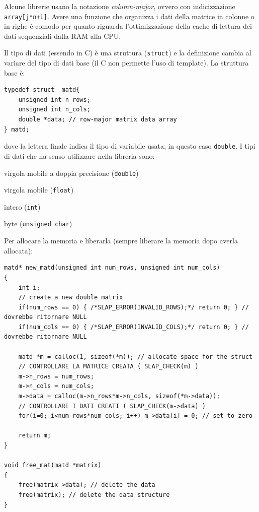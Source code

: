 \documentclass[10pt]{article}
\begin{document}
Alcune librerie usano la notazione \textit{column-major}, ovvero con indicizzazione \verb|array[j*n+i]|. Avere una funzione che organizza i dati della matrice in colonne o in righe è comodo per quanto riguarda l'ottimizzazione della cache di lettura dei dati sequenziali dalla RAM alla CPU.

Il tipo di dati (essendo in C) è una struttura (\verb|struct|) e la definizione cambia al variare del tipo di dati base (il C non permette l'uso di template).
La struttura base è:
\begin{lstlisting}
typedef struct _matd{
	unsigned int n_rows;
	unsigned int n_cols;
	double *data; // row-major matrix data array
} matd;
\end{lstlisting}
dove la lettera finale indica il tipo di variabile usata, in questo caso \verb|double|. I tipi di dati che ha senso utilizzare nella libreria sono:
\begin{description}[noitemsep]
\item[\texttt{d}] virgola mobile a doppia precisione (\verb|double|)
\item[\texttt{f}] virgola mobile (\verb|float|)
\item[\texttt{i}] intero (\verb|int|)
\item[\texttt{b}] byte (\verb|unsigned char|)
\end{description}

Per allocare la memoria e liberarla (sempre liberare la memoria dopo averla allocata):
\begin{lstlisting}
matd* new_matd(unsigned int num_rows, unsigned int num_cols)
{
	int i;
	// create a new double matrix
	if(num_rows == 0) { /*SLAP_ERROR(INVALID_ROWS);*/ return 0; } // dovrebbe ritornare NULL
	if(num_cols == 0) { /*SLAP_ERROR(INVALID_COLS);*/ return 0; } // dovrebbe ritornare NULL
	
	matd *m = calloc(1, sizeof(*m)); // allocate space for the struct
	// CONTROLLARE LA MATRICE CREATA ( SLAP_CHECK(m) )
	m->n_rows = num_rows;
	m->n_cols = num_cols;
	m->data = calloc(m->n_rows*m->n_cols, sizeof(*m->data));
	// CONTROLLARE I DATI CREATI ( SLAP_CHECK(m->data) )
	for(i=0; i<num_rows*num_cols; i++) m->data[i] = 0; // set to zero
	
	return m;
}

void free_mat(matd *matrix)
{
	free(matrix->data); // delete the data
	free(matrix); // delete the data structure
}
\end{lstlisting}
\end{document}
